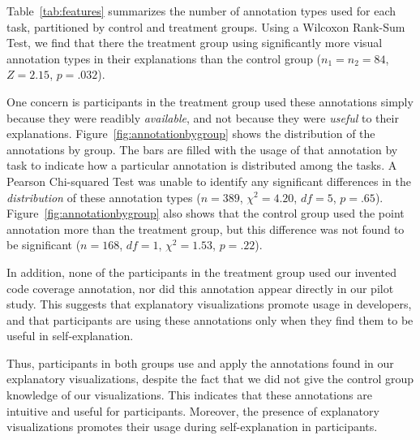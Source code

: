 \documentclass[conference]{IEEEtran}
\begin{document}
Table~\ref{tab:features} summarizes the number of annotation types used for each task, partitioned by control and treatment groups. Using a Wilcoxon Rank-Sum Test, we find that there the treatment group using significantly more visual annotation types in their explanations than the control group ($n_1 = n_2 = 84$, $Z = 2.15$, $p = .032$).

One concern is participants in the treatment group used these annotations simply because they were readibly \textit{available}, and not because they were \textit{useful} to their explanations. Figure~\ref{fig:annotationbygroup} shows the distribution of the annotations by group. The bars are filled with the usage of that annotation by task to indicate how a particular annotation is distributed among the tasks. A Pearson Chi-squared Test was unable to identify any significant differences in the \emph{distribution} of these annotation types ($n = 389$, $\chi^2 = 4.20$, $df = 5$, $p = .65$). Figure~\ref{fig:annotationbygroup} also shows that the control group used the point annotation more than the treatment group, but this difference was not found to be significant ($n = 168$, $df = 1$, $\chi^2 = 1.53$, $p = .22$).

In addition, none of the participants in the treatment group used our invented code coverage annotation, nor did this annotation appear directly in our pilot study. This suggests that explanatory visualizations promote usage in developers, and that participants are using these annotations only when they find them to be useful in self-explanation.

Thus, participants in both groups use and apply the annotations found in our explanatory visualizations, despite the fact that we did not give the control group knowledge of our visualizations. This indicates that these annotations are intuitive and useful for participants. Moreover, the presence of explanatory visualizations promotes their usage during self-explanation in participants.
\end{document}
